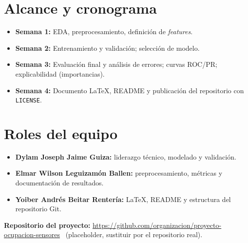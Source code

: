 \documentclass[11pt,letterpaper]{article}
\begin{document}
\section*{Alcance y cronograma}
\begin{itemize}[leftmargin=1.2em,itemsep=0.2em]
    \item \textbf{Semana 1:} EDA, preprocesamiento, definición de \textit{features}.
    \item \textbf{Semana 2:} Entrenamiento y validación; selección de modelo.
    \item \textbf{Semana 3:} Evaluación final y análisis de errores; curvas ROC/PR; explicabilidad (importancias).
    \item \textbf{Semana 4:} Documento \LaTeX{}, README y publicación del repositorio con \texttt{LICENSE}.
\end{itemize}

\section*{Roles del equipo}
\begin{itemize}[leftmargin=1.2em,itemsep=0.2em]
    \item \textbf{Dylam Joseph Jaime Guiza:} liderazgo técnico, modelado y validación.
    \item \textbf{Elmar Wilson Leguizamón Ballen:} preprocesamiento, métricas y documentación de resultados.
    \item \textbf{Yoiber Andrés Beitar Rentería:} \LaTeX{}, README y estructura del repositorio Git.
\end{itemize}

\noindent\textbf{Repositorio del proyecto:} \url{https://github.com/organizacion/proyecto-ocupacion-sensores} \ (placeholder, sustituir por el repositorio real).

\printbibliography
\end{document}
